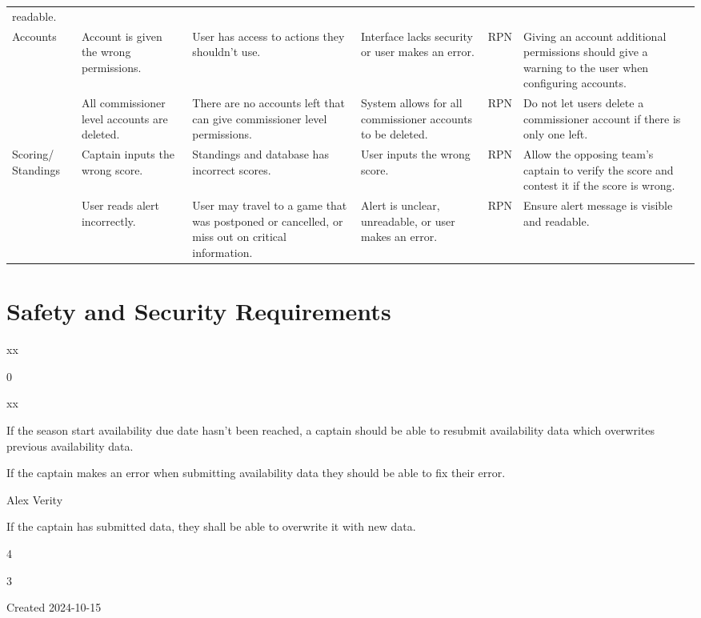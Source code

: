 \documentclass{article}
\newenvironment{myreq}[1]{%
\setlist[description]{font=\normalfont\color{darkgray}}%
\begin{tcolorbox}[colframe=black,colback=white, sharp corners, boxrule=1pt]%
\bfseries\color{blue}%
\begin{description}#1}%
{\end{description}\end{tcolorbox}}
\newcommand{\threeinline}[3]{\begin{multicols}{3}#1 #2 #3\end{multicols}}
\newcommand{\twoinline}[2]{\begin{multicols}{2}#1 #2\end{multicols}}
\newcommand{\reqno}{\item[Requirement \#:]}
\newcommand{\reqtype}{\item[Requirement Type:]}
\newcommand{\reqevent}{\item[Event/BUC/PUC \#:]}
\newcommand{\reqdesc}{\item[Description:]}
\newcommand{\reqrat}{\item[Rationale:]}
\newcommand{\reqorig}{\item[Originator:]}
\newcommand{\reqfit}{\item[Fit Criterion:]}
\newcommand{\reqsatis}{\item[Customer Satisfaction:]}
\newcommand{\reqdissat}{\item[Customer Dissatisfaction:]}
\newcommand{\reqhist}{\item[History:]}
\begin{document}
\begin{landscape}
\begin{tabularx}{504pt}{|p{3cm}||p{4cm}|p{4cm}|p{4cm}|p{1cm}|p{5.75cm}|}
readable.\\
\cline{1-6}
\multirow{2}{2cm}{Accounts} & Account is given the wrong permissions. & User 
has access to actions they shouldn't use. & Interface lacks security or user
makes an error. & RPN & Giving an account additional permissions should give
a warning to the user when configuring accounts.\\
\cline{2-6}
& All commissioner level accounts are deleted. & There are no accounts left
that can give commissioner level permissions. & System allows for all
commissioner accounts to be deleted. & RPN & Do not let users delete a
commissioner account if there is only one left.\\
\cline{1-6}
\multirow{3}{2cm}{Scoring/ Standings} & Captain inputs the wrong score. &
Standings and database has incorrect scores. & User inputs the wrong score. &
RPN & Allow the opposing team's captain to verify the score and contest it if
the score is wrong.\\
\cline{2-6}
\cline{1-6}
\multirow{3}{2cm}{Alerts} & User reads alert incorrectly. &
User may travel to a game that was postponed or cancelled, or miss out on
critical information. & Alert is unclear, unreadable, or user makes an error. &
RPN & Ensure alert message is visible and readable.\\
\cline{2-6}
\hline
\end{tabularx}

\end{landscape}


\section{Safety and Security Requirements}


\begin{myreq}
    \threeinline
      {\reqno xx}
      {\reqtype 0}
      {\reqevent xx}
    \reqdesc If the season start availability due date hasn't been reached, a
    captain should be able to resubmit availability data which overwrites
    previous availability data.
    \reqrat If the captain makes an error when submitting availability data
    they should be able to fix their error.
    \reqorig Alex Verity
    \reqfit If the captain has submitted data, they shall be able to overwrite
    it with new data.
    \twoinline
      {\reqsatis 4}
      {\reqdissat 3}
    \reqhist Created 2024-10-15
\end{myreq}
\end{document}
